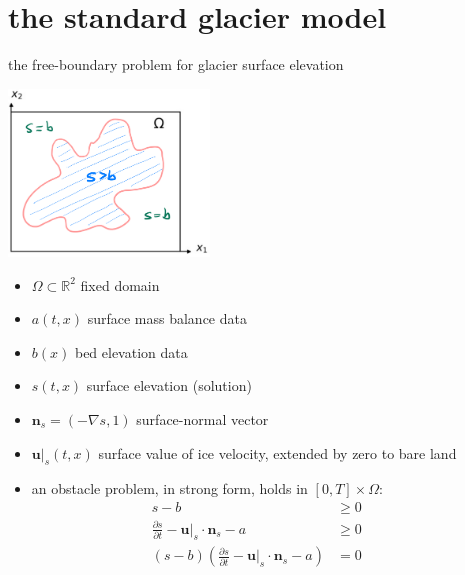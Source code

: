 \documentclass[10pt,svgnames]{beamer}
\newcommand{\bn}{\mathbf{n}}
\newcommand{\bu}{\mathbf{u}}
\newcommand{\RR}{\mathbb{R}}
\newcommand{\grad}{\nabla}
\newcommand{\aler}[1]{{\color{FireBrick} #1}}
\begin{document}
\section{the standard glacier model}

\begin{frame}{the free-boundary problem for glacier surface elevation}

\hfill \includegraphics[width=0.4\textwidth]{mapplane}

\vspace{-39mm}

\begin{minipage}[t]{60mm}
{\small
\begin{itemize}
\item $\Omega \subset \RR^2$ fixed domain
\item $a(t,x)$ surface mass balance data
\item $b(x)$ bed elevation data
\item \aler{$s(t,x)$ surface elevation (solution)}
\item $\bn_s = (- \grad s,1)$ surface-normal vector
\item $\bu|_s(t,x)$ surface value of ice velocity, extended by zero to bare land
\end{itemize}
}
\end{minipage}

\begin{itemize}
\item an obstacle problem, in strong form, holds in $[0,T] \times \Omega$:
\begin{align*}
s - b &\ge 0 &&\phantom{x} \\
\frac{\partial s}{\partial t} - \bu|_s \cdot \bn_s - a &\ge 0 \\
(s - b) \left(\frac{\partial s}{\partial t} - \bu|_s \cdot \bn_s - a\right) &= 0
\end{align*}
\end{itemize}
\end{frame}
\end{document}
